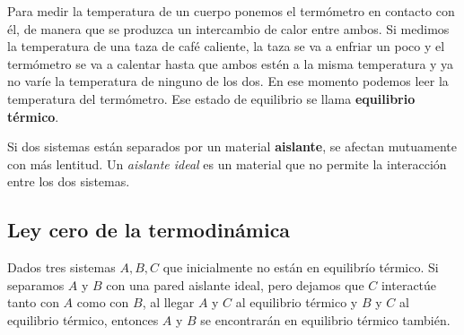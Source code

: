 \documentclass[12pt]{article}
\begin{document}
  Para medir la temperatura de un cuerpo ponemos el termómetro en contacto con él, de manera que se produzca un intercambio de calor entre ambos. Si medimos la temperatura de una taza de café caliente, la taza se va a enfriar un poco y el termómetro se va a calentar hasta que ambos estén a la misma temperatura y ya no varíe la temperatura de ninguno de los dos. En ese momento podemos leer la temperatura del termómetro. Ese estado de equilibrio se llama \textbf{equilibrio térmico}.

  Si dos sistemas están separados por un material \textbf{aislante}, se afectan mutuamente con más lentitud. Un \textit{aislante ideal} es un material que no permite la interacción entre los dos sistemas.

  \subsection{Ley cero de la termodinámica}
  Dados tres sistemas $ A,B,C $ que inicialmente no están en equilibrío térmico. Si separamos $ A $ y $ B $ con una pared aislante ideal, pero dejamos que $ C $ interactúe tanto con $ A $ como con $ B $, al llegar $ A $ y $ C $ al equilibrio térmico y $ B $ y $ C $ al equilibrio térmico, entonces $ A $ y $ B $ se encontrarán en equilibrio térmico también.
\end{document}
